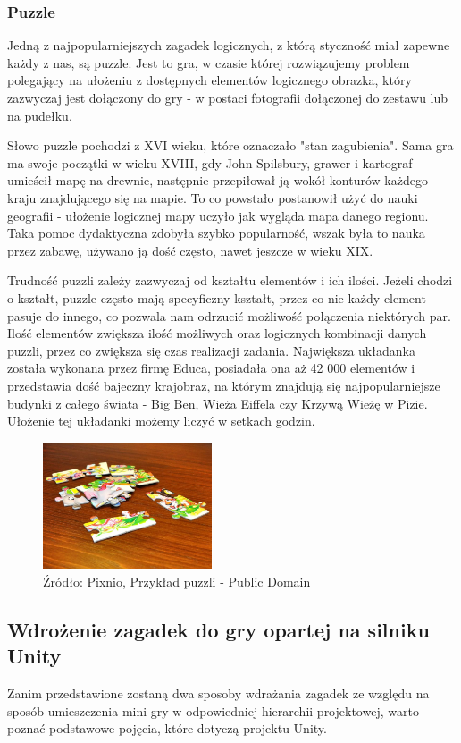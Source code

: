 \documentclass[oneside,polski,logo]{amuthesis}
\begin{document}
\subsubsection{Puzzle}
Jedną z najpopularniejszych zagadek logicznych, z którą styczność miał zapewne każdy z nas, są puzzle. Jest to gra, w czasie której rozwiązujemy problem polegający na ułożeniu z dostępnych elementów logicznego obrazka, który zazwyczaj jest dołączony do gry - w postaci fotografii dołączonej do zestawu lub na pudełku.
 
Słowo puzzle pochodzi z XVI wieku, które oznaczało "stan zagubienia". Sama gra ma swoje początki w wieku XVIII, gdy John Spilsbury, grawer i kartograf umieścił mapę na drewnie, następnie przepiłował ją wokół konturów każdego kraju znajdującego się na mapie. To co powstało postanowił użyć do nauki geografii - ułożenie logicznej mapy uczyło jak wygląda mapa danego regionu. Taka pomoc dydaktyczna zdobyła szybko popularność, wszak była to nauka przez zabawę, używano ją dość często, nawet jeszcze w wieku XIX.  

Trudność puzzli zależy zazwyczaj od kształtu elementów i ich ilości. Jeżeli chodzi o kształt, puzzle często mają specyficzny kształt, przez co nie każdy element pasuje do innego, co pozwala nam odrzucić możliwość połączenia niektórych par. Ilość elementów zwiększa ilość możliwych oraz logicznych kombinacji danych puzzli, przez co zwiększa się czas realizacji zadania. Największa układanka została wykonana przez firmę Educa, posiadała ona aż 42 000 elementów i przedstawia dość bajeczny krajobraz, na którym znajdują się najpopularniejsze budynki z całego świata - Big Ben, Wieża Eiffela czy Krzywą Wieżę w Pizie. Ułożenie tej układanki możemy liczyć w setkach godzin. \cite{puzzle}

\begin{figure}[h]
	\centering
	\includegraphics[width=5cm]{images/tyrek/puzzle.jpg}
	\caption{Źródło: Pixnio, Przykład puzzli - Public Domain}
\end{figure}

\subsection{Wdrożenie zagadek do gry opartej na silniku Unity}
Zanim przedstawione zostaną dwa sposoby wdrażania zagadek ze względu na sposób umieszczenia mini-gry w odpowiedniej hierarchii projektowej, warto poznać podstawowe pojęcia, które dotyczą projektu Unity.
\end{document}
